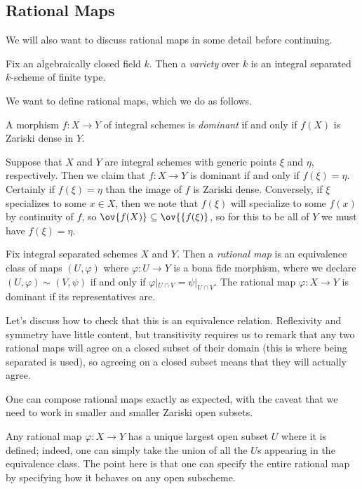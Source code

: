 \documentclass[../notes.tex]{subfiles}
\begin{document}
\subsection{Rational Maps}
We will also want to discuss rational maps in some detail before continuing.
\begin{definition}[variety]
	Fix an algebraically closed field $k$. Then a \textit{variety} over $k$ is an integral separated $k$-scheme of finite type.
\end{definition}
We want to define rational maps, which we do as follows.
\begin{definition}[dominant]
	A morphism $f\colon X\to Y$ of integral schemes is \textit{dominant} if and only if $f(X)$ is Zariski dense in $Y$.
\end{definition}
\begin{remark}
	Suppose that $X$ and $Y$ are integral schemes with generic points $\xi$ and $\eta$, respectively. Then we claim that $f\colon X\to Y$ is dominant if and only if $f(\xi)=\eta$. Certainly if $f(\xi)=\eta$ than the image of $f$ is Zariski dense. Conversely, if $\xi$ specializes to some $x\in X$, then we note that $f(\xi)$ will specialize to some $f(x)$ by continuity of $f$, so $\ov{f(X)}\subseteq\ov{\{f(\xi)}$, so for this to be all of $Y$ we must have $f(\xi)=\eta$.
\end{remark}
\begin{definition}[rational]
	Fix integral separated schemes $X$ and $Y$. Then a \textit{rational map} is an equivalence class of maps $(U,\varphi)$ where $\varphi\colon U\to Y$ is a bona fide morphism, where we declare $(U,\varphi)\sim(V,\psi)$ if and only if $\varphi|_{U\cap V}=\psi|_{U\cap V}$. The rational map $\varphi\colon X\to Y$ is dominant if its representatives are.
\end{definition}
\begin{remark}
	Let's discuss how to check that this is an equivalence relation. Reflexivity and symmetry have little content, but transitivity requires us to remark that any two rational maps will agree on a closed subset of their domain (this is where being separated is used), so agreeing on a closed subset means that they will actually agree.
\end{remark}
\begin{remark}
	One can compose rational maps exactly as expected, with the caveat that we need to work in smaller and smaller Zariski open subsets.
\end{remark}
\begin{remark}
	Any rational map $\varphi\colon X\to Y$ has a unique largest open subset $U$ where it is defined; indeed, one can simply take the union of all the $U$s appearing in the equivalence class. The point here is that one can specify the entire rational map by specifying how it behaves on any open subscheme.
\end{remark}
\end{document}
